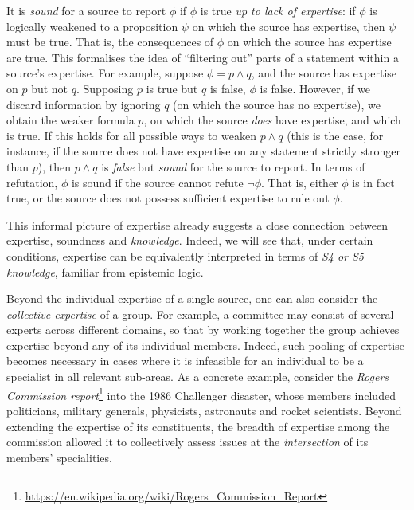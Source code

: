 
It is \emph{sound} for a source to report $\phi$ if $\phi$ is true \emph{up to
lack of expertise}: if $\phi$ is logically weakened to a proposition $\psi$ on
which the source has expertise, then $\psi$ must be true. That is, the
consequences of $\phi$ on which the source has expertise are true.
%
This formalises the idea of ``filtering out'' parts of a statement within a
source's expertise. For example, suppose $\phi = p \land q$, and the source has
expertise on $p$ but not $q$. Supposing $p$ is true but $q$ is false, $\phi$ is
false. However, if we discard information by ignoring $q$ (on which the source
has no expertise), we obtain the weaker formula $p$, on which the source
\emph{does} have expertise, and which is true. If this holds for all possible
ways to weaken $p \land q$ (this is the case, for instance, if the source does
not have expertise on any statement strictly stronger than $p$), then $p \land
q$ is \emph{false} but \emph{sound} for the source to report.
%
In terms of refutation, $\phi$ is sound if the source cannot refute $\neg\phi$.
That is, either $\phi$ is in fact true, or the source does not possess
sufficient expertise to rule out $\phi$.

This informal picture of expertise already suggests a close connection between
expertise, soundness and \emph{knowledge}. Indeed, we will see that, under
certain conditions, expertise can be equivalently interpreted in terms of
\emph{S4 or S5 knowledge}, familiar from epistemic logic.

Beyond the individual expertise of a single source, one can also consider the
\emph{collective expertise} of a group. For example, a committee may consist of
several experts across different domains, so that by working together the group
achieves expertise beyond any of its individual members. Indeed, such pooling
of expertise becomes necessary in cases where it is infeasible for an
individual to be a specialist in all relevant sub-areas. As a concrete example,
consider the \emph{Rogers Commission
report}\footnote{\url{https://en.wikipedia.org/wiki/Rogers_Commission_Report}}
into the 1986 Challenger disaster, whose members included politicians, military
generals, physicists, astronauts and rocket scientists. Beyond extending the
expertise of its constituents, the breadth of expertise among the commission
allowed it to collectively assess issues at the \emph{intersection} of its
members' specialities.

